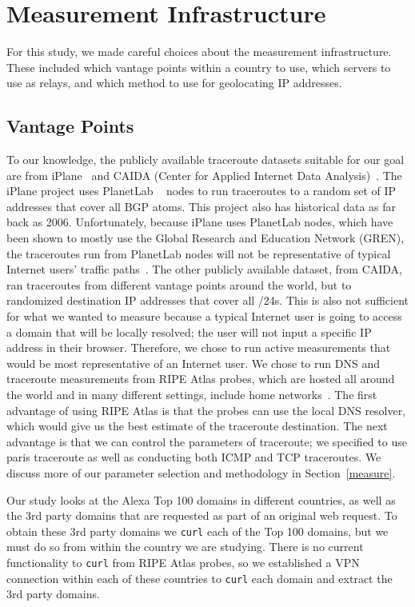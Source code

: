 \section{Measurement Infrastructure}
\label{datasets}
For this study, we made careful choices about the measurement infrastructure.  These included which vantage points within a country to use, which servers to use as relays, and which method to use for geolocating IP addresses.

\subsection{Vantage Points}
To our knowledge, the publicly available traceroute datasets suitable for our goal are from iPlane~\cite{madhyastha2006iplane} and CAIDA (Center for Applied Internet Data Analysis)~\cite{caida}.  The iPlane project uses PlanetLab ~\cite{planetlab} nodes to run traceroutes to a random set of IP addresses that cover all BGP atoms.  This project also has historical data as far back as 2006.  Unfortunately, because iPlane uses PlanetLab nodes, which have been shown to mostly use the Global Research and Education Network (GREN), the traceroutes run from PlanetLab nodes will not be representative of typical Internet users' traffic paths~\cite{banerjee2004interdomain}.  The other publicly available dataset, from CAIDA, ran traceroutes from different vantage points around the world, but to randomized destination IP addresses that cover all /24s.  This is also not sufficient for what we wanted to measure because a typical Internet user is going to access a domain that will be locally resolved; the user will not input a specific IP address in their browser.  Therefore, we chose to run active measurements that would be most representative of an Internet user.  We chose to run DNS and traceroute measurements from RIPE Atlas probes, which are hosted all around the world and in many different settings, include home networks~\cite{ripe_atlas}.  The first advantage of using RIPE Atlas is that the probes can use the local DNS resolver, which would give us the best estimate of the traceroute destination.  The next advantage is that we can control the parameters of traceroute; we specified to use paris traceroute as well as conducting both ICMP and TCP traceroutes.  We discuss more of our parameter selection and methodology in Section~\ref{measure}.

Our study looks at the Alexa Top 100 domains in different countries, as well as the 3rd party domains that are requested as part of an original web request.  To obtain these 3rd party domains we {\tt curl} each of the Top 100 domains, but we must do so from within the country we are studying.  There is no current functionality to {\tt curl} from RIPE Atlas probes, so we established a VPN connection within each of these countries to {\tt curl} each domain and extract the 3rd party domains.


